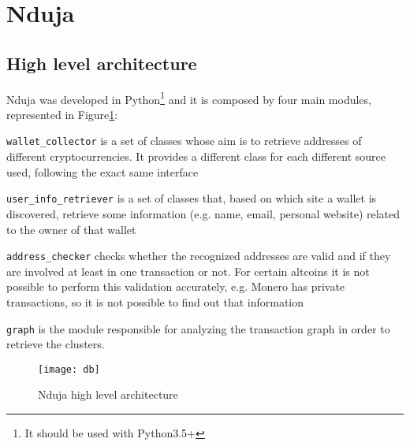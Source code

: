 \newcommand{\walletcollector}{\texttt{wallet\_collector}}
\newcommand{\userinforetriever}{\texttt{user\_info\_retriever}}
\newcommand{\addresschecker}{\texttt{address\_checker}}
\newcommand{\graph}{\texttt{graph}}

\section{Nduja} \label{nduja}
\subsection{High level architecture}
Nduja was developed in Python\footnote{It should be used with Python3.5+} and it
is composed by four main modules, represented in Figure\ref{fig:architecture}:
\begin{enumerate*}[label=\roman*),itemjoin={,\quad}]
\item \walletcollector{} is a set of classes whose aim is to retrieve
addresses of different cryptocurrencies. It provides a different class for each
different source used, following the exact same interface
\item \userinforetriever{} is a set of classes that, based on which
site a wallet is discovered, retrieve some information (e.g. name, email,
personal website) related to the owner of that wallet
\item \addresschecker{} checks whether the recognized addresses are valid and if
they are involved at least in one transaction or not. For certain
altcoins it is not possible to perform this validation accurately, e.g.
Monero has private transactions, so it is not possible to find out that
information
\item \graph{} is the module responsible for analyzing the transaction graph
in order to retrieve the clusters.
\end{enumerate*}

\begin{figure}[t]
\centering
\texttt{[image: db]}
\caption{Nduja high level architecture}
\label{fig:architecture}
\end{figure}

